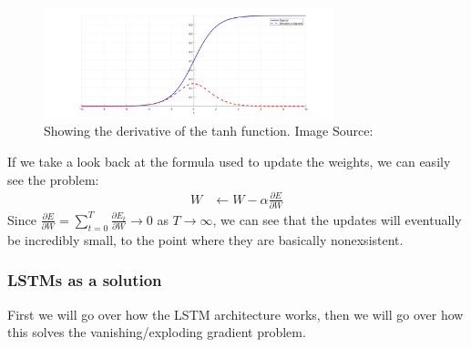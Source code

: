 \begin{figure}[h]
    \centering
        \includegraphics[width=0.75\textwidth]{latex/imgs/tanh_deriv.png}
    \caption{Showing the derivative of the tanh function. Image Source:\cite{grad}}
    \label{fig:tanh_deriv}
\end{figure}
If we take a look back at the formula used to update the weights, we can easily see the problem:
\begin{align}
    W &\leftarrow W - \alpha \frac{\partial E}{\partial W}
\end{align}
Since $\frac{\partial E}{\partial W} = \sum_{t=0}^{T} \frac{\partial E_t}{\partial W} \rightarrow 0$ as $T \rightarrow \infty$, we can see that the updates will eventually be incredibly small, to the point where they are basically nonexsistent.

\subsubsection{LSTMs as a solution}
First we will go over how the LSTM architecture works, then we will go over how this solves the vanishing/exploding gradient problem.\\

